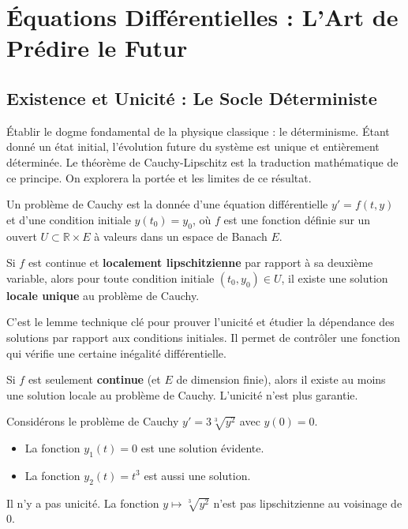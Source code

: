 \chapter{Équations Différentielles : L'Art de Prédire le Futur}

\section{Existence et Unicité : Le Socle Déterministe}

\begin{objectif}
    Établir le dogme fondamental de la physique classique : le déterminisme. Étant donné un état initial, l'évolution future du système est unique et entièrement déterminée. Le théorème de Cauchy-Lipschitz est la traduction mathématique de ce principe. On explorera la portée et les limites de ce résultat.
\end{objectif}

\begin{definition}
    Un problème de Cauchy est la donnée d'une équation différentielle $y' = f(t,y)$ et d'une condition initiale $y(t_0) = y_0$, où $f$ est une fonction définie sur un ouvert $U \subset \mathbb{R} \times E$ à valeurs dans un espace de Banach $E$.
\end{definition}

\begin{theorem}
    Si $f$ est continue et \textbf{localement lipschitzienne} par rapport à sa deuxième variable, alors pour toute condition initiale $(t_0, y_0) \in U$, il existe une solution \textbf{locale unique} au problème de Cauchy.
\end{theorem}

\begin{lemma}
    C'est le lemme technique clé pour prouver l'unicité et étudier la dépendance des solutions par rapport aux conditions initiales. Il permet de contrôler une fonction qui vérifie une certaine inégalité différentielle.
\end{lemma}

\begin{theorem}
    Si $f$ est seulement \textbf{continue} (et $E$ de dimension finie), alors il existe au moins une solution locale au problème de Cauchy. L'unicité n'est plus garantie.
\end{theorem}

\begin{example}
    Considérons le problème de Cauchy $y' = 3\sqrt[3]{y^2}$ avec $y(0)=0$.
    \begin{itemize}
        \item La fonction $y_1(t) = 0$ est une solution évidente.
        \item La fonction $y_2(t) = t^3$ est aussi une solution.
    \end{itemize}
    Il n'y a pas unicité. La fonction $y \mapsto \sqrt[3]{y^2}$ n'est pas lipschitzienne au voisinage de 0.
\end{example}


